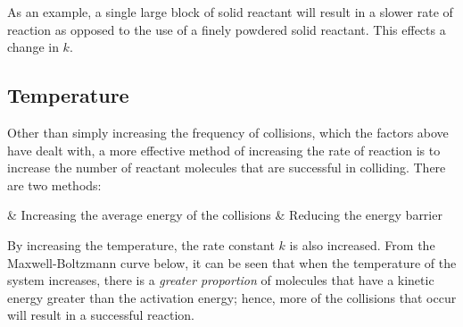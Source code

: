 			As an example, a single large block of solid reactant will result in a slower rate of reaction as opposed to the use of a
			finely powdered solid reactant. This effects a change in $k$.



		\pagebreak
		\subsection{Temperature}

			Other than simply increasing the frequency of collisions, which the factors above have dealt with, a more effective method of
			increasing the rate of reaction is to increase the number of reactant molecules that are successful in colliding. There are two methods:

			\begin{bulletlist}
				& Increasing the average energy of the collisions
				& Reducing the energy barrier
			\end{bulletlist}

			By increasing the temperature, the rate constant $k$ is also increased. From the Maxwell-Boltzmann curve below, it can be seen that
			when the temperature of the system increases, there is a \textit{greater proportion} of molecules that have a kinetic energy greater
			than the activation energy; hence, more of the collisions that occur will result in a successful reaction.


